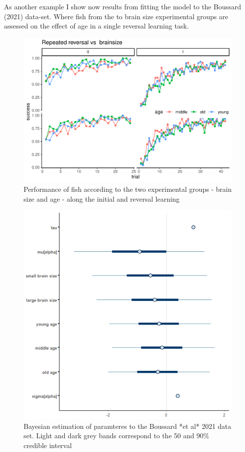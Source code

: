 \documentclass[
]{article}
\begin{document}
As another example I show now results from fitting the model to the
Boussard (2021) data-set. Where fish from the to brain size experimental
groups are assessed on the effect of age in a single reversal learning
task.

\begin{figure}

\includegraphics{report_files/figure-latex/unnamed-chunk-7-1} \hfill{}

\caption{Performance of fish according to the two experimental groups  - brain size and age - along the initial and reversal learning}\label{fig:unnamed-chunk-7}
\end{figure}

\begin{figure}

\includegraphics[width=6.67in,]{images/boussard2intervals} \hfill{}

\caption{Bayesian estimation of paramteres to the Boussard *et al* 2021 data set. Light and dark grey bands correspond to the 50 and 90\% credible interval}\label{fig:unnamed-chunk-8}
\end{figure}
\end{document}

